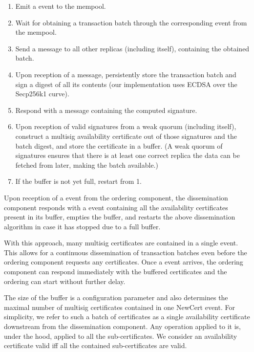 \documentclass{article}
\begin{document}
\begin{enumerate}
\item Emit a  event to the mempool.
\item Wait for obtaining a transaction batch through the corresponding  event from the mempool.
\item Send a  message to all other replicas (including itself), containing the obtained batch.
\item Upon reception of a  message,
persistently store the transaction batch and sign a digest of all its contents
(our implementation uses ECDSA over the Secp256k1 curve).
\item Respond with a  message containing the computed signature.
\item Upon reception of valid signatures from a weak quorum (including itself),
construct a multisig availability certificate out of those signatures and the batch digest,
and store the certificate in a buffer.
(A weak quorum of signatures ensures that there is at least one correct replica the data can be fetched from later,
making the batch available.)
\item If the buffer is not yet full, restart from 1.
\end{enumerate}

Upon reception of a  event from the ordering component,
the dissemination component responds with a  event
containing all the availability certificates present in its buffer, empties the buffer,
and restarts the above dissemination algorithm in case it has stopped due to a full buffer.

With this approach, many multisig certificates are contained in a single  event.
This allows for a continuous dissemination of transaction batches
even before the ordering component requests any certificates.
Once a  event arrives, the ordering component can respond immediately with the buffered certificates
and the ordering can start without further delay.

The size of the buffer is a configuration parameter
and also determines the maximal number of multisig certificates contained in one NewCert event.
For simplicity, we refer to such a batch of certificates as a single availability certificate
downstream from the dissemination component.
Any operation applied to it is, under the hood, applied to all the sub-certificates.
We consider an availability certificate valid iff all the contained sub-certificates are valid.
\end{document}
